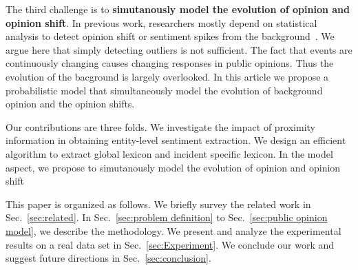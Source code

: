 \documentclass[runningheads]{llncs}
\begin{document}
The third challenge is to \textbf{simutanously model the evolution of opinion and opinion shift}.
In previous work, researchers mostly depend on statistical analysis to detect opinion shift or sentiment spikes from the background~\cite{}.
We argue here that simply detecting outliers is not sufficient.
The fact that events are continuously changing causes changing responses in public opinions.
Thus the evolution of the bacground is largely overlooked.
In this article we propose a probabilistic model that simultaneously model the evolution of background opinion and the opinion shifts.

Our contributions are three folds. 
We investigate the impact of proximity information in obtaining entity-level sentiment extraction.
We design an efficient algorithm to extract global lexicon and incident specific lexicon.
In the model aspect, we propose to simutanously model the evolution of opinion and opinion shift

This paper is organized as follows. We briefly survey the related work in Sec.~\ref{sec:related}. In Sec.~\ref{sec:problem definition} to Sec.~\ref{sec:public opinion model}, we describe the methodology. We present and analyze the experimental results on a real data set in Sec.~\ref{sec:Experiment}. We conclude our work and suggest future directions in Sec.~\ref{sec:conclusion}.
\end{document}
